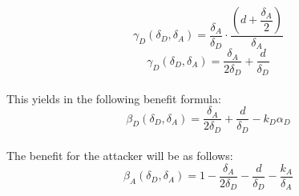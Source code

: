 \begin{equation*}\label{first}
\gamma_{D}(\delta_{D},\delta_{A}) = \dfrac{\delta_{A}}{\delta_{D}} \cdot \dfrac{(d+\dfrac{\delta_{A}}{2})}{\delta_{A}} 
\end{equation*}
\begin{equation*}\label{first}
\gamma_{D}(\delta_{D},\delta_{A}) = \dfrac{\delta_{A}}{2\delta_{D}} + \dfrac{d}{\delta_{D}} 
\end{equation*}\\
This yields in the following benefit formula:
\begin{equation*}\label{first}
\beta_{D}(\delta_{D},\delta_{A}) = \dfrac{\delta_{A}}{2\delta_{D}} + \dfrac{d}{\delta_{D}} - k_{D} \alpha_{D} 
\end{equation*}\\

The benefit for the attacker will be as follows:
\begin{equation*}\label{first}
\beta_{A}(\delta_{D},\delta_{A}) = 1 -\dfrac{\delta_{A}}{2\delta_{D}} - \dfrac{d}{\delta_{D}} - \dfrac{k_{A}}{ \delta_{A}} 
\end{equation*}\\


